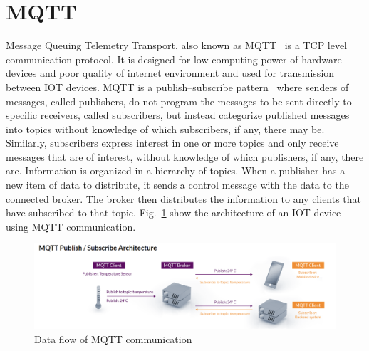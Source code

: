 \section{MQTT}
Message Queuing Telemetry Transport, also known as MQTT~\cite{mqtt-intro} is a TCP level communication protocol. It is designed for low computing power of hardware devices and poor quality of internet environment and used for transmission between IOT devices. MQTT is a publish–subscribe pattern~\cite{pub-sub} where senders of messages, called publishers, do not program the messages to be sent directly to specific receivers, called subscribers, but instead categorize published messages into topics without knowledge of which subscribers, if any, there may be. Similarly, subscribers express interest in one or more topics and only receive messages that are of interest, without knowledge of which publishers, if any, there are. Information is organized in a hierarchy of topics. When a publisher has a new item of data to distribute, it sends a control message with the data to the connected broker. The broker then distributes the information to any clients that have subscribed to that topic. Fig.~\ref{fig:mqtt-data-flow} show the architecture of an IOT device using MQTT communication. 

\begin{figure}[H]
    \centering
    \includegraphics[width=\textwidth]{figsrc/mqtt-data-flow.png}
    \caption{Data flow of MQTT communication~\cite{mqtt-data-flow}\label{fig:mqtt-data-flow}}
\end{figure}

